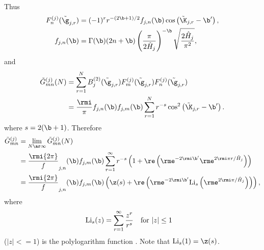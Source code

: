 \documentclass[a4paper,10pt]{article}
\begin{document}
Thus
\begin{subequations}
\begin{align}
F_n^{(j)}(\tilde \g_{j,r})&=
(-1)^{r}r^{-(2\b+1)/2}f_{j,n}(\b)\cos\left(\tilde\K_{j,r}-\b'\right),\\
f_{j,n}(\b)&=\Gamma(\b)(2n+\b)\left(\frac\pi{2\hat H_{j}}\right)^{-\b}
\sqrt{\frac{2\hat H_{j}}{\pi^{2} }},
\end{align}
\end{subequations}
and
\begin{align}\label{Gmn-app0}
\tilde G_{mn}^{(j)}(N)
 &=\sum_{r=1}^{N}B_j^{(2)}(\tilde\g_{j,r})F_m^{(j)}(\tilde\g_{j,r})F^{(j)}_n(\tilde\g_{j,r})
 \notag\\
 &=\frac\rmi\pi f_{j,n}(\b)f_{j,m}(\b)\sum_{r=1}^{N}r^{-s}
 \cos^{2}\left(\tilde\K_{j,r}-\b'\right).
 \end{align}
where $s=2(\b+1)$.
Therefore
\begin{align}\label{Gmn-app}
\tilde G_{mn}^{(j)}
&=\lim_{N\ar\infty}\tilde G_{mn}^{(j)}(N)
\notag\\
 &=\frac\rmi{2\pi} f_{j,n}(\b)f_{j,m}(\b)\sum_{r=1}^{\infty}r^{-s}
 \left (1+\re\left (\rme^{-2\rmi\b'} \rme^{2\rmi\pi r/\hat H_{j}}\right)\right)
\notag\\
 &=\frac\rmi{2\pi} f_{j,n}(\b)f_{j,m}(\b)
 \left ( \z(s)+\re\left (\rme^{-2\rmi\b'}{\rm Li}_{s} \left(\rme^{2\rmi\pi /\hat H_{j}}\right)\right)\right),
 \end{align}
 where
\begin{align}
{\rm Li}_{s}(z)&=\sum_{r=1}^{\infty}\frac{z^{r}}{r^{s}}
\quad\text{for }|z|\leq1
\end{align}
($|z|<=1$) is the polylogarithm function \citep{wood1992-polylog-techrep}. Note that ${\rm Li}_{s}(1)=\z(s)$.
\end{document}

